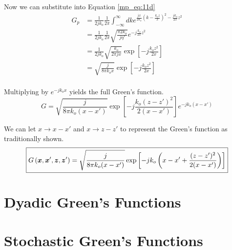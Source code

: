 Now we can substitute into Equation \ref{mp_eq:11d}
\begin{equation}
\begin{aligned}
G_p &= \frac{1}{2jk_o}\frac{1}{2\pi}\int_{-\infty}^{\infty}dk e^{\frac{jx}{2k_o}\left(k  -\frac{k_oz}{x}\right)^2- \frac{jk_o}{2x}z^2 } \\
&= \frac{1}{2jk_o}\frac{1}{2\pi} \sqrt{\frac{\pi 2k_o}{j\eta'}}e^{-j\frac{k_o}{2x}z^2 } \\
&= \frac{1}{2jk_o}\sqrt{\frac{k_o}{2\pi jx}}\exp\left[-j\frac{k_oz^2}{2x} \right]\\
&= \sqrt{\frac{j}{8\pi k_ox}}\exp\left[-j\frac{k_oz^2}{2x} \right]\\
\end{aligned}
\label{mp_eq:11f}
\end{equation}

Multiplying by $e^{-jk_ox}$ yields the full Green's function.
\begin{equation}
G= \sqrt{\frac{j}{8\pi k_o(x-x')}}\exp\left[-j\frac{k_o(z-z')^2}{2(x-x')} \right]e^{-jk_o(x-x')}
\label{mp_eq:11fa}
\end{equation}
 
We can let $x\rightarrow x-x'$ and $x\rightarrow z-z'$ to represent the Green's function as traditionally shown.
\begin{equation}
\boxed{G\left(\boldsymbol{x},\boldsymbol{x}',\boldsymbol{z},\boldsymbol{z}' \right)= \sqrt{\frac{j}{8\pi k_o(x-x')}}\exp\left[-jk_o\left(x-x' + \frac{(z-z')^2}{2(x-x')}\right) \right]}\\
\label{mp_eq:11fb}
\end{equation}

\section{Dyadic Green's Functions}


\section{Stochastic Green's Functions}


